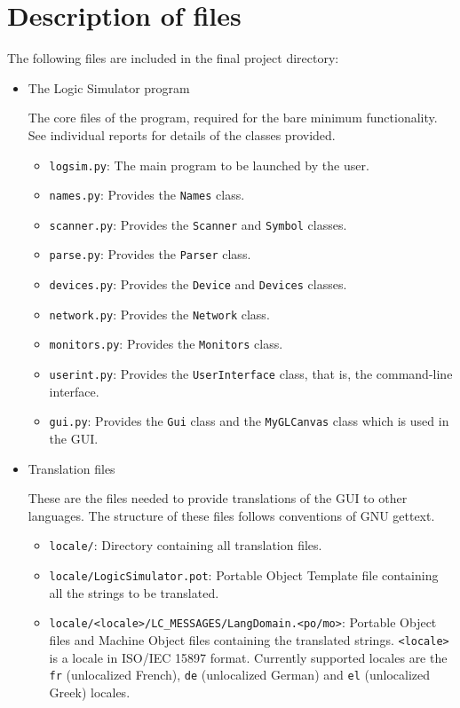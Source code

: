 \section{Description of files}
The following files are included in the final project directory:

\begin{itemize}
\item The Logic Simulator program

  The core files of the program, required for the bare minimum functionality.
  See individual reports for details of the classes provided.
  \begin{itemize}
  \item \texttt{logsim.py}: The main program to be launched by the user.
  \item \texttt{names.py}: Provides the \texttt{Names} class.
  \item \texttt{scanner.py}: Provides the \texttt{Scanner} and
    \texttt{Symbol} classes.
  \item \texttt{parse.py}: Provides the \texttt{Parser} class.
  \item \texttt{devices.py}: Provides the \texttt{Device} and
    \texttt{Devices} classes.
  \item \texttt{network.py}: Provides the \texttt{Network} class.
  \item \texttt{monitors.py}: Provides the \texttt{Monitors} class.
  \item \texttt{userint.py}: Provides the \texttt{UserInterface} class,
    that is, the command-line interface.
  \item \texttt{gui.py}: Provides the \texttt{Gui} class and the
    \texttt{MyGLCanvas} class which is used in the GUI.
  \end{itemize}
\item Translation files

  These are the files needed to provide translations of the GUI to
  other languages. The structure of these files follows conventions
  of GNU gettext.

  \begin{itemize}
  \item \texttt{locale/}: Directory containing all translation files.
  \item \texttt{locale/LogicSimulator.pot}: Portable Object Template
    file containing all the strings to be translated.
  \item \texttt{locale/<locale>/LC\_MESSAGES/LangDomain.<po/mo>}:
    Portable Object files and Machine Object files containing the
    translated strings. \texttt{<locale>} is a locale in
    ISO/IEC 15897 format. Currently supported locales are the \texttt{fr}
    (unlocalized French), \texttt{de} (unlocalized German) and
    \texttt{el} (unlocalized Greek) locales.
  \end{itemize}


\end{itemize}
